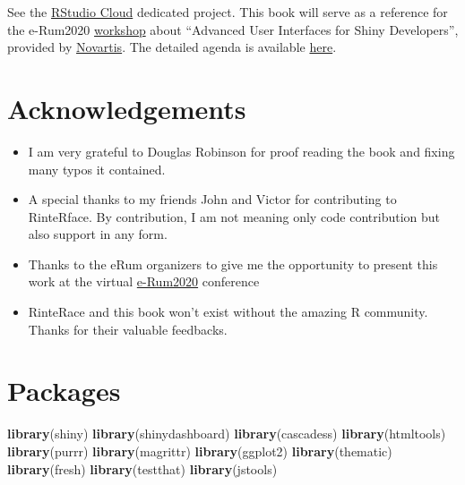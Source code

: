 \documentclass[]{book}
\newenvironment{Shaded}{\begin{snugshade}}{\end{snugshade}}
\newcommand{\KeywordTok}[1]{\textcolor[rgb]{0.13,0.29,0.53}{\textbf{#1}}}
\newcommand{\NormalTok}[1]{#1}
\providecommand{\tightlist}{%
  \setlength{\itemsep}{0pt}\setlength{\parskip}{0pt}}
\begin{document}
See the \href{https://rstudio.cloud}{RStudio Cloud} dedicated project.
This book will serve as a reference for the e-Rum2020 \href{https://2020.erum.io/program/workshops/}{workshop} about ``Advanced User Interfaces for Shiny Developers'', provided by \href{https://www.novartis.com}{Novartis}. The detailed agenda is available \href{https://github.com/Novartis/Advanced-User-Interfaces-for-Shiny-Developers}{here}.

\hypertarget{acknowledgements}{%
\section*{Acknowledgements}\label{acknowledgements}}

\begin{itemize}
\tightlist
\item
  I am very grateful to Douglas Robinson for proof reading the book and fixing many typos it contained.
\item
  A special thanks to my friends John and Victor for contributing to RinteRface. By contribution, I am not meaning only code contribution but also support in any form.
\item
  Thanks to the eRum organizers to give me the opportunity to present this work at the virtual \href{https://2020.erum.io}{e-Rum2020} conference
\item
  RinteRace and this book won't exist without the amazing R community. Thanks for their valuable feedbacks.
\end{itemize}

\hypertarget{packages}{%
\section*{Packages}\label{packages}}

\begin{Shaded}
\begin{Highlighting}[]
\KeywordTok{library}\NormalTok{(shiny)}
\KeywordTok{library}\NormalTok{(shinydashboard)}
\KeywordTok{library}\NormalTok{(cascadess)}
\KeywordTok{library}\NormalTok{(htmltools)}
\KeywordTok{library}\NormalTok{(purrr)}
\KeywordTok{library}\NormalTok{(magrittr)}
\KeywordTok{library}\NormalTok{(ggplot2)}
\KeywordTok{library}\NormalTok{(thematic)}
\KeywordTok{library}\NormalTok{(fresh)}
\KeywordTok{library}\NormalTok{(testthat)}
\KeywordTok{library}\NormalTok{(jstools)}
\end{Highlighting}
\end{Shaded}
\end{document}
